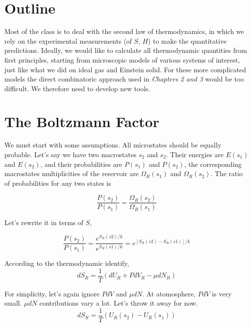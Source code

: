 

\section{Outline}
Most of the class is to deal with the second law of thermodynamics, in which we rely on the experimental measurements (of $S$, $H$) to make the
quantitative predictions. Ideally, we would like to calculate all thermodynamic quantities from first principles, starting from microscopic models
of various systems of interest, just like what we did on ideal gas and Einstein solid. For these more complicated models the direct combinatoric approach
used in \textit{Chapters 2 and 3} would be too difficult. We therefore need to develop new tools.

\section{The Boltzmann Factor}

We must start with some assumptions. All microstates should be equally probable. Let's say we have two macrostates $s_2$ and $s_2$. Their energies are $E(s_1)$ and $E(s_2)$, and their probabilities are $P(s_1)$ and $P(s_2)$, the corresponding macrostates multiplicities of the reservoir are
$\Omega_R(s_1)$ and $\Omega_R(s_2)$. The ratio of probabilities for any two states is
 
\begin{equation} \frac{P(s_2)}{P(s_1)} = \frac{\Omega_R(s_2)}{\Omega_R(s_1)} \end{equation}

Let's rewrite it in terms of $S$,

\begin{equation} \frac{P(s_2)}{P(s_1)} = \frac{e^{S_R(s2)/k}}{e^{S_R(s1)/k}} = e^{[S_R(s2)-S_R(s1)]/k} \end{equation}

According to the thermodynamic identify,
\begin{equation}
dS_R = \frac{1}{T} (dU_R + PdV_R - \mu dN_R) 
\end{equation}

For simplicity, let's again ignore $PdV$ and $\mu dN$. At atomosphere, $PdV$ is very small. $\mu dN$ contributions vary a lot. Let's throw it away for now.
\begin{equation}
dS_R = \frac{1}{T} (U_R(s_2) - U_R(s_1)) 
\end{equation}

